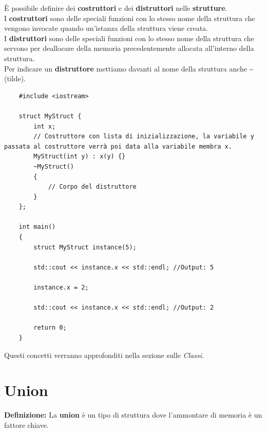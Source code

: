 \textsf{\small È possibile definire dei \textbf{costruttori} e dei \textbf{distruttori} nelle \textbf{strutture}.} \\

\textsf{\small I \textbf{costruttori} sono delle speciali funzioni con lo stesso nome della struttura che vengono invocate quando un'istanza della struttura viene creata.} \\

\textsf{\small I \textbf{distruttori} sono delle speciali funzioni con lo stesso nome della struttura che servono per deallocare della memoria precedentemente allocata all'interno della struttura.} \\

\textsf{\small Per indicare un \textbf{distruttore} mettiamo davanti al nome della struttura anche \textbf{\textasciitilde} (tilde).} \\

\begin{lstlisting}
	#include <iostream>
	
	struct MyStruct {
		int x;
		// Costruttore con lista di inizializzazione, la variabile y passata al costruttore verrà poi data alla variabile membra x.
		MyStruct(int y) : x(y) {}
		~MyStruct()
		{
			// Corpo del distruttore
		}
	};

	int main()
	{
		struct MyStruct instance(5);
		
		std::cout << instance.x << std::endl; //Output: 5
		
		instance.x = 2;
		
		std::cout << instance.x << std::endl; //Output: 2
		
		return 0;
	}
\end{lstlisting}

\textsf{\small Questi concetti verranno approfonditi nella sezione sulle \emph{Classi}.} \\


\section{Union}

\textsf{\small \textbf{Definizione: } La \textbf{union} è un tipo di struttura dove l'ammontare di memoria è un fattore chiave.} \\

